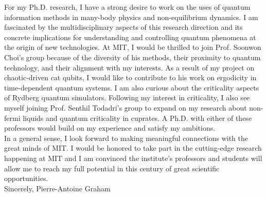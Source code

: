 \documentclass[12pt]{article}
\begin{document}
For my Ph.D. research, I have a strong desire to work on the uses of quantum information methods in many-body physics and non-equilibrium dynamics. I am fascinated by the multidisciplinary aspects of this research direction and its concrete implications for understanding and controlling quantum phenomena at the origin of new technologies. At MIT, I would be thrilled to join Prof. Soonwon Choi's group because of the diversity of his methods, their proximity to quantum technology, and their alignment with my interests. As a result of my project on chaotic-driven cat qubits, I would like to contribute to his work on ergodicity in time-dependent quantum systems. I am also curious about the criticality aspects of Rydberg quantum simulators. Following my interest in criticality, I also see myself joining Prof. Senthil Todadri's group to expand on my research about non-fermi liquids and quantum criticality in cuprates. A Ph.D. with either of these professors would build on my experience and satisfy my ambitions.\\[0.2cm]

In a general sense, I look forward to making meaningful connections with the great minds of MIT. I would be honored to take part in the cutting-edge research happening at MIT and I am convinced the institute's professors and students will allow me to reach my full potential in this century of great scientific opportunities.\\

Sincerely,
Pierre-Antoine Graham
\end{document}
